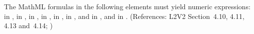 The MathML formulas in the following elements must yield numeric
expressions:  in \KineticLaw,
 in \SpeciesReference,  in
\InitialAssignment,  in \AssignmentRule, 
in \RateRule,  in \AlgebraicRule, and  in
\Event, and  in \EventAssignment.  (References:
L2V2 Section~4.10, 4.11, 4.13 and~4.14; )


